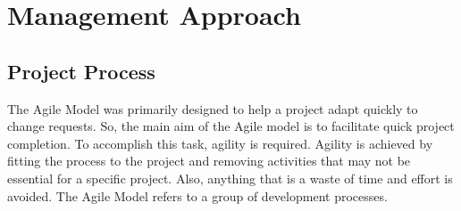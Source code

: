 \chapter{Management Approach}

\section{Project Process}
The Agile Model was primarily designed to help a project adapt quickly to change requests. So, the main aim of the Agile model is to facilitate quick project completion. To accomplish this task, agility is required. Agility is achieved by fitting the process to the project and removing activities that may not be essential for a specific project. Also, anything that is a waste of time and effort is avoided. The Agile Model refers to a group of development processes.

